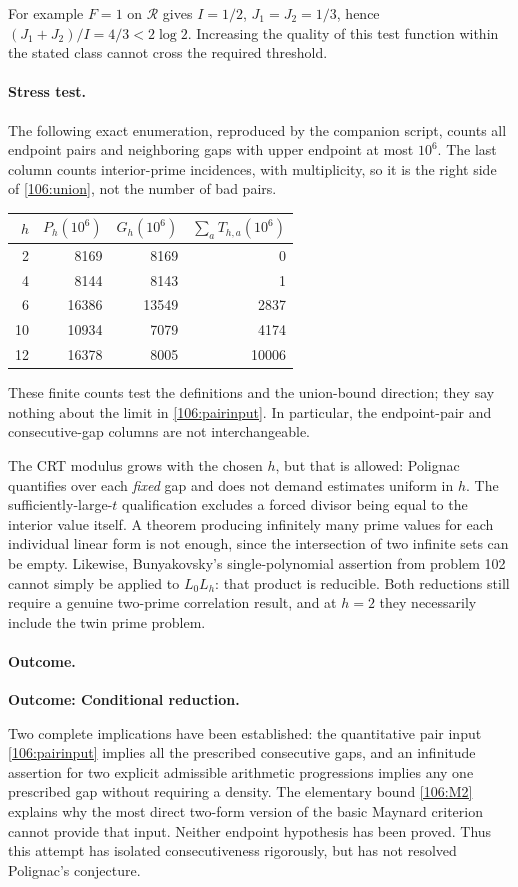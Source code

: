 \documentclass[11pt,a4paper]{article}
\numberwithin{equation}{section}
\begin{document}
For example $F=1$ on $\mathcal R$ gives $I=1/2$, $J_1=J_2=1/3$, hence
$(J_1+J_2)/I=4/3<2\log2$. Increasing the quality of this test function within
the stated class cannot cross the required threshold.

\paragraph{Stress test.}
The following exact enumeration, reproduced by the companion script, counts
all endpoint pairs and neighboring gaps with upper endpoint at most
$10^6$. The last column counts interior-prime incidences, with multiplicity,
so it is the right side of \eqref{106:union}, not the number of bad pairs.
\begin{center}
\begin{tabular}{r|r|r|r}
$h$ & $P_h(10^6)$ & $G_h(10^6)$ & $\sum_a T_{h,a}(10^6)$\\\hline
2 & 8169 & 8169 & 0\\
4 & 8144 & 8143 & 1\\
6 & 16386 & 13549 & 2837\\
10 & 10934 & 7079 & 4174\\
12 & 16378 & 8005 & 10006
\end{tabular}
\end{center}
These finite counts test the definitions and the union-bound direction;
they say nothing about the limit in \eqref{106:pairinput}. In particular,
the endpoint-pair and consecutive-gap columns are not interchangeable.

The CRT modulus grows with the chosen $h$, but that is allowed: Polignac
quantifies over each \emph{fixed} gap and does not demand estimates uniform
in $h$. The sufficiently-large-$t$ qualification excludes a forced divisor
being equal to the interior value itself. A theorem producing infinitely
many prime values for each individual linear form is not enough, since the
intersection of two infinite sets can be empty. Likewise, Bunyakovsky's
single-polynomial assertion from problem 102 cannot simply be applied to
$L_0L_h$: that product is reducible. Both reductions still require a genuine
two-prime correlation result, and at $h=2$ they necessarily include the twin
prime problem.

\paragraph{Outcome.}
\textbf{Outcome: Conditional reduction.}

Two complete implications have been established: the quantitative pair input
\eqref{106:pairinput} implies all the prescribed consecutive gaps, and an
infinitude assertion for two explicit admissible arithmetic progressions
implies any one prescribed gap without requiring a density. The elementary
bound \eqref{106:M2} explains why the most direct two-form version of the
basic Maynard criterion cannot provide that input. Neither endpoint
hypothesis has been proved. Thus this attempt has isolated consecutiveness
rigorously, but has not resolved Polignac's conjecture.
\end{document}
